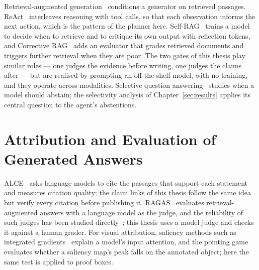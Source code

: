 Retrieval-augmented generation~\cite{lewis2020rag} conditions a generator on
retrieved passages. ReAct~\cite{yao2023react} interleaves reasoning with tool calls,
so that each observation informs the next action, which is the pattern of the planner
here. Self-RAG~\cite{asai2024selfrag} trains a model to decide when to retrieve and to
critique its own output with reflection tokens, and Corrective
RAG~\cite{yan2024crag} adds an evaluator that grades retrieved documents and triggers
further retrieval when they are poor. The two gates of this thesis play similar roles
--- one judges the evidence before writing, one judges the claims after --- but are
realised by prompting an off-the-shelf model, with no training, and they operate
across modalities. Selective question answering~\cite{kamath2020selective} studies
when a model should abstain; the selectivity analysis of Chapter~\ref{sec:results}
applies its central question to the agent's abstentions.

\section{Attribution and Evaluation of Generated Answers}

ALCE~\cite{gao2023alce} asks language models to cite the passages that support each
statement and measures citation quality; the claim links of this thesis follow the
same idea but verify every citation before publishing it. RAGAS~\cite{es2024ragas}
evaluates retrieval-augmented answers with a language model as the judge, and the
reliability of such judges has been studied directly~\cite{zheng2023judge}; this
thesis uses a model judge and checks it against a human grader. For visual
attribution, saliency methods such as integrated
gradients~\cite{sundararajan2017axiomatic} explain a model's input attention, and the
pointing game~\cite{zhang2018pointing} evaluates whether a saliency map's peak falls on
the annotated object; here the same test is applied to proof boxes.
